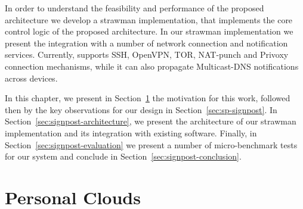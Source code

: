 
In order to understand the feasibility and performance of the proposed
architecture we develop a strawman implementation, that implements the core
control logic of the proposed architecture.  In our strawman implementation we
present the integration with a number of network connection and notification
services.  Currently, \signpost supports SSH, OpenVPN, TOR, NAT-punch and
Privoxy connection mechanisms, while it can also propagate Multicast-DNS
notifications across devices.

In this chapter, we present in Section~\ref{sec:signpost-introduction} the
motivation for this work, followed then by the key observations for our design
in Section~\ref{sec:sp-signpost}. In
Section~\ref{sec:signpost-architecture}, we present the architecture of our
strawman implementation and its integration with existing software. Finally, in
Section~\ref{sec:signpost-evaluation} we present a number of micro-benchmark
tests for our system and conclude in Section~\ref{sec:signpost-conclusion}.

\section{Personal Clouds}\label{sec:signpost-introduction}



